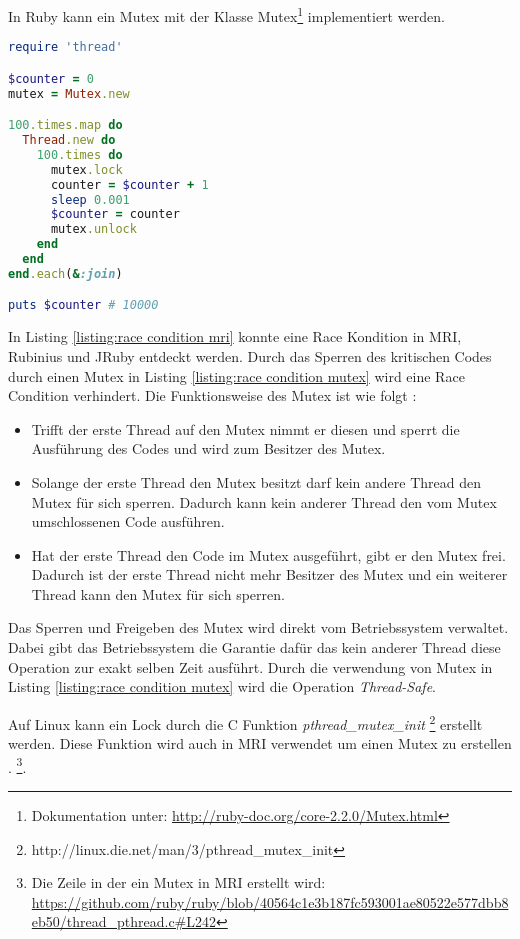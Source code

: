 In Ruby kann ein Mutex mit der Klasse Mutex\footnote{Dokumentation unter:  \url{http://ruby-doc.org/core-2.2.0/Mutex.html}} implementiert werden.


\begin{lstlisting}[language=Ruby,label={listing:race condition mutex}]
require 'thread'

$counter = 0
mutex = Mutex.new

100.times.map do
  Thread.new do
    100.times do
      mutex.lock
      counter = $counter + 1
      sleep 0.001
      $counter = counter
      mutex.unlock
    end
  end
end.each(&:join)

puts $counter # 10000
\end{lstlisting}

In Listing \ref{listing:race condition mri} konnte eine Race Kondition in MRI, Rubinius und JRuby entdeckt werden. Durch das Sperren des kritischen Codes durch einen Mutex in Listing \ref{listing:race condition mutex} wird eine Race Condition verhindert. Die Funktionsweise des Mutex ist wie folgt \cite[p. 83-84]{Sto2013}: 

\begin{itemize}
  \item Trifft der erste Thread auf den Mutex nimmt er diesen und sperrt die Ausführung des Codes und wird zum Besitzer des Mutex.
  \item Solange der erste Thread den Mutex besitzt darf kein andere Thread den Mutex für sich sperren. Dadurch kann kein anderer Thread den vom Mutex umschlossenen Code ausführen. 
  \item Hat der erste Thread den Code im Mutex ausgeführt, gibt er den Mutex frei. Dadurch ist der erste Thread nicht mehr Besitzer des Mutex und ein weiterer Thread kann den Mutex für sich sperren.
\end{itemize}

Das Sperren und Freigeben des Mutex wird direkt vom Betriebssystem verwaltet. Dabei gibt das Betriebssystem die Garantie dafür das kein anderer Thread diese Operation zur exakt selben Zeit ausführt. Durch die verwendung von Mutex in Listing \ref{listing:race condition mutex} wird die Operation \emph{Thread-Safe}.

Auf Linux kann ein Lock durch die C Funktion \emph{pthread_mutex_init} \footnote{http://linux.die.net/man/3/pthread_mutex_init} erstellt werden. Diese Funktion wird auch in MRI verwendet um einen Mutex zu erstellen \cite[p. 83-84]{Sto2013}. \footnote{Die Zeile in der ein Mutex in MRI erstellt wird: \url{https://github.com/ruby/ruby/blob/40564c1e3b187fc593001ae80522e577dbb8eb50/thread_pthread.c#L242}}.

